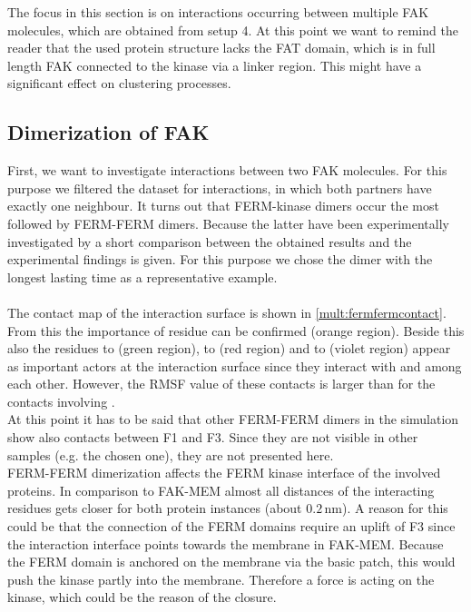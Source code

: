 \label{multiProt}
The focus in this section is on interactions occurring between multiple FAK molecules, which are obtained from setup 4. At this point we want to remind the reader that the used protein structure lacks the FAT domain, which is in full length FAK connected to the kinase via a linker region. This might have a significant effect on clustering processes.
\subsection{Dimerization of FAK}
\label{mult:dimers}
First, we want to investigate interactions between two FAK molecules. For this purpose we filtered the dataset for interactions, in which both partners have exactly one neighbour. It turns out that FERM-kinase dimers occur the most followed by FERM-FERM dimers. Because the latter have been experimentally investigated by \textcite{fakdimers} a short comparison between the obtained results and the experimental findings is given. For this purpose we chose the dimer with the longest lasting time as a representative example.\\ %
\\
The contact map of the interaction surface is shown in \autoref{mult:fermfermcontact}. From this the importance of residue  can be confirmed (orange region). Beside this also the residues  to  (green region),  to  (red region) and  to  (violet region) appear as important actors at the interaction surface since they interact with  and among each other. However, the RMSF value of these contacts is larger than for the contacts involving .\\
At this point it has to be said that other FERM-FERM dimers in the simulation show also contacts between F1 and F3. Since they are not visible in other samples (e.g. the chosen one), they are not presented here.\\
FERM-FERM dimerization affects the FERM kinase interface of the involved proteins. In comparison to FAK-MEM almost all distances of the interacting residues gets closer for both protein instances (about $0.2\,\si{\nano\metre}$). A reason for this could be that the connection of the FERM domains require an uplift of F3 since the interaction interface points towards the membrane in FAK-MEM. Because the FERM domain is anchored on the membrane via the basic patch, this would push the kinase partly into the membrane. Therefore a force is acting on the kinase, which could be the reason of the closure. %
